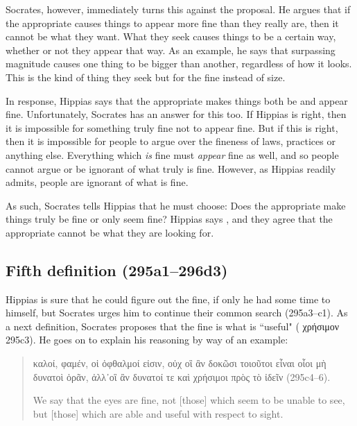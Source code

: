 \documentclass[11pt]{article}
\begin{document}
Socrates, however, immediately turns this against the proposal.  He argues that
if the appropriate causes things to appear more fine than they really are, then
it cannot be what they want.  What they seek causes things to be a certain way,
whether or not they appear that way.  As an example, he says that surpassing
magnitude causes one thing to be bigger than another, regardless of how it
looks.  This is the kind of thing they seek but for the fine instead of size.

In response, Hippias says that the appropriate makes things both be and appear
fine.  Unfortunately, Socrates has an answer for this too.  If Hippias is
right, then it is impossible for something truly fine not to appear fine.  But
if this is right, then it is impossible for people to argue over the fineness
of laws, practices or anything else.  Everything which \emph{is} fine must
\emph{appear} fine as well, and so people cannot argue or be ignorant of what
truly is fine.  However, as Hippias readily admits, people are ignorant of what
is fine.

As such, Socrates tells Hippias that he must choose: Does the appropriate make
things truly be fine or only seem fine?  Hippias says , and
they agree that the appropriate cannot be what they are looking for.


\subsection{Fifth definition (295a1--296d3)}

Hippias is sure that he could figure out the fine, if only he had some time to
himself, but Socrates urges him to continue their common search (295a3--c1).
As a next definition, Socrates proposes that the fine is what is ``useful" ({\g
χρήσιμον} 295c3).  He goes on to explain his reasoning by way of an example:

\begin{quote}

    {\g καλοί, φαμέν, οἱ ὀφθαλμοί εἰσιν, οὐχ οἳ ἂν δοκῶσι τοιοῦτοι εἶναι οἷοι
    μὴ δυνατοὶ ὁρᾶν, ἀλλ᾽οἳ ἂν δυνατοί τε καὶ χρήσιμοι πρὸς τὸ ἰδεῖν}
    (295c4--6).

    We say that the eyes are fine, not [those] which seem to be unable to see,
    but [those] which are able and useful with respect to sight.

\end{quote}
\end{document}
